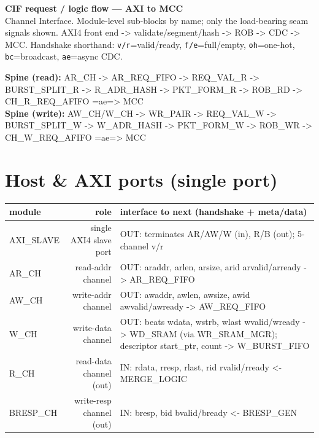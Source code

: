 \documentclass[9pt]{extarticle}
\newenvironment{flow}{%
  \footnotesize\rowcolors{2}{white}{zeb}\begin{longtable}{M R I}
  \rowcolor{hb}\textbf{module} & \textbf{role} & \textbf{interface to next (handshake + meta/data)}\\ \midrule\endhead}
  {\bottomrule\end{longtable}}
\begin{document}
\begin{center}
{\LARGE\textbf{CIF request / logic flow --- AXI to MCC}}\\[2pt]
{\small Channel Interface. Module-level sub-blocks by name; only the load-bearing seam signals shown.
AXI4 front end -> validate/segment/hash -> ROB -> CDC -> MCC. Handshake shorthand:
\texttt{v/r}=valid/ready, \texttt{f/e}=full/empty, \texttt{oh}=one-hot, \texttt{bc}=broadcast, \texttt{ae}=async CDC.}
\end{center}

\noindent\textbf{Spine (read):}\quad
{\ttfamily\footnotesize AR_CH -> AR_REQ_FIFO -> REQ_VAL_R -> BURST_SPLIT_R -> R_ADR_HASH
-> PKT_FORM_R -> ROB_RD -> CH_R_REQ_AFIFO =ae=> MCC}\\[1pt]
\noindent\textbf{Spine (write):}\quad
{\ttfamily\footnotesize AW_CH/W_CH -> WR_PAIR -> REQ_VAL_W -> BURST_SPLIT_W -> W_ADR_HASH
-> PKT_FORM_W -> ROB_WR -> CH_W_REQ_AFIFO =ae=> MCC}

\section{Host \& AXI ports  \textcolor{headbg}{(single port)}}
\begin{flow}
AXI_SLAVE & single AXI4 slave port & OUT: terminates AR/AW/W (in), R/B (out);  5-channel v/r\\
AR_CH & read-addr channel & OUT: {araddr, arlen, arsize, arid}  arvalid/arready -> AR_REQ_FIFO\\
AW_CH & write-addr channel & OUT: {awaddr, awlen, awsize, awid}  awvalid/awready -> AW_REQ_FIFO\\
W_CH & write-data channel & OUT: beats {wdata, wstrb, wlast} wvalid/wready -> WD_SRAM (via WR_SRAM_MGR);  descriptor {start_ptr, count} -> W_BURST_FIFO\\
R_CH & read-data channel (out) & IN: {rdata, rresp, rlast, rid}  rvalid/rready  <- MERGE_LOGIC\\
BRESP_CH & write-resp channel (out) & IN: {bresp, bid}  bvalid/bready  <- BRESP_GEN\\
\end{flow}
\end{document}
